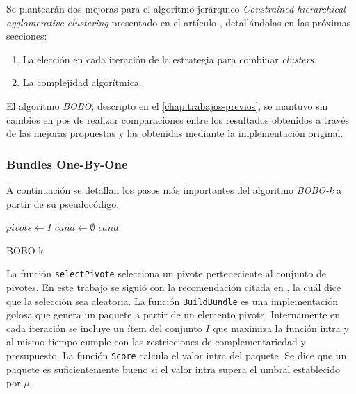 Se plantearán dos mejoras para el algoritmo jerárquico \textit{Constrained hierarchical agglomerative clustering} presentado en el artículo \cite{journals/tkde/Amer-YahiaBCFMZ14}, detallándolas en las próximas secciones:
\begin{enumerate}
	\item La elección en cada iteración de la estrategia para combinar \textit{clusters}.
	\item La complejidad algorítmica.
\end{enumerate}

El algoritmo \textit{BOBO}, descripto en el \autoref{chap:trabajos-previos}, se mantuvo sin cambios en pos de realizar comparaciones entre los resultados obtenidos a través de las mejoras propuestas y las obtenidas mediante la implementación original.

\subsubsection{Bundles One-By-One}
A continuación se detallan los pasos más importantes del algoritmo \textit{BOBO-k} a partir de su pseudocódigo.

\begin{center}
	\begin{algorithm}[H]
	\DontPrintSemicolon
	\SetAlgoLined
		$pivots \leftarrow I$\;
		$cand \leftarrow \emptyset$\;
		\Return $cand$\;
	\caption{BOBO-k}\label{alg:bobo}
	\end{algorithm}
\end{center}

La función \texttt{selectPivote} selecciona un pivote perteneciente al conjunto de pivotes. En este trabajo se siguió con la recomendación citada en \cite{Zhang:2002:ESI:638644.638646}, la cuál dice que la selección sea aleatoria. La función \texttt{BuildBundle} es una implementación golosa que genera un paquete a partir de un elemento pivote. Internamente en cada iteración se incluye un ítem del conjunto $I$ que maximiza la función intra y al mismo tiempo cumple con las restricciones de complementariedad y presupuesto. La función \texttt{Score} calcula el valor intra del paquete. Se dice que un paquete es suficientemente bueno si el valor intra supera el umbral establecido por $\mu$.


